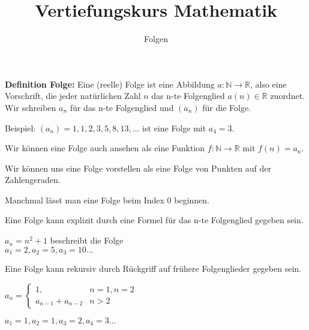\usepackage[ngerman]{babel}
\usepackage[utf8]{inputenc}
\usepackage{amsmath}
\usepackage{amssymb}
\usepackage{listings} 
\usepackage{stmaryrd}
\lstset{language=Python, tabsize=4, showstringspaces=false,basicstyle=\footnotesize,mathescape=true} 
\usepackage{mathtools}
\usepackage{ulem}
\usepackage{tikz}

\parskip 10pt




\title{Vertiefungskurs Mathematik}   
\author{Folgen} 
\date{}
\frame{\titlepage} 

\begin{frame}[fragile]


\textbf{Definition Folge:} Eine (reelle) Folge ist eine Abbildung $a: \mathbb{N} \rightarrow \mathbb{R}$, also
eine Vorschrift, die jeder natürlichen Zahl $n$ das n-te Folgenglied $a(n) \in \mathbb{R}$ zuordnet. \pause
Wir schreiben $a_n$ für das n-te Folgenglied und $(a_n)$ für die Folge. \\ \pause
\bigskip

Beispiel: $(a_n) = 1, 1, 2, 3, 5, 8, 13, ... $ ist eine Folge mit $a_4 = 3$. \pause

Wir können eine Folge auch ansehen als eine Funktion $f: \mathbb{N} \rightarrow \mathbb{R}$ mit $f(n) = a_n$. \pause

Wir können uns eine Folge vorstellen als eine Folge von Punkten auf der Zahlengeraden. \pause

Manchmal lässt man eine Folge beim Index 0 beginnen.
\end{frame}


\begin{frame}[fragile]
Eine Folge kann explizit durch eine Formel für das n-te Folgenglied gegeben sein. \\ \bigskip \pause

 $a_n = n^2 +1$ \quad beschreibt die Folge  \pause \\ $a_1 = 2, a_2 = 5, a_3 = 10 ...$ \\
\bigskip  \pause

Eine Folge kann rekursiv durch Rückgriff auf frühere Folgenglieder gegeben sein. \\ \bigskip 

$a_n=\begin{cases}
 1,  & n=1, n=2 \\
 a_{n-1}+a_{n-2} & n > 2 
\end{cases} $  \pause \\  \bigskip

$a_1 = 1, a_2 = 1, a_3 = 2, a_4 = 3 ...$ \\
\end{frame}
 

